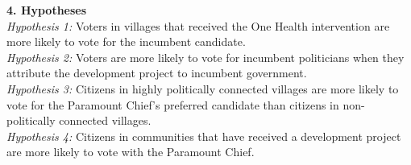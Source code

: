 \documentclass[11pt]{article}
\begin{document}
\textbf{4. Hypotheses}\\
\emph{Hypothesis 1:} Voters in villages that received the One Health intervention are more likely to vote for the incumbent candidate.\\

\emph{Hypothesis 2:} Voters are more likely to vote for incumbent politicians when they attribute the development project to incumbent government.\\

\emph{Hypothesis 3:} Citizens in highly politically connected villages are more likely to vote for the Paramount Chief's preferred candidate than citizens in non-politically connected villages.\\

\emph{Hypothesis 4:} Citizens in communities that have received a development project are more likely to vote with the Paramount Chief.
\end{document}
